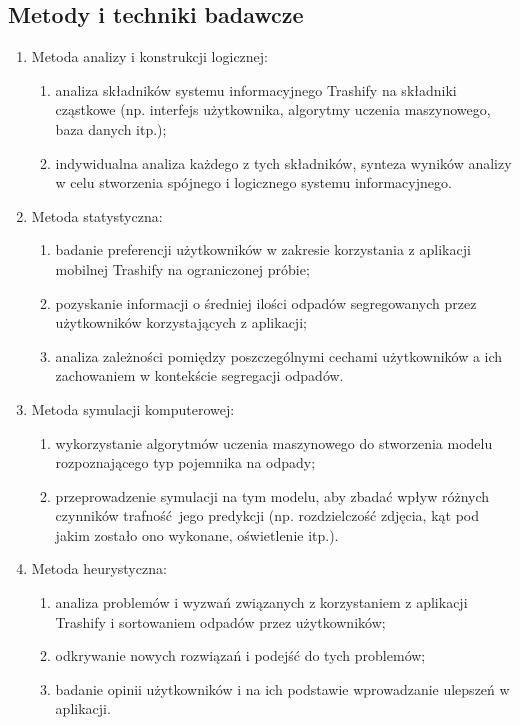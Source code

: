 \documentclass[12pt,twoside]{book}
\begin{document}
\subsection{Metody i techniki badawcze}
\begin{enumerate}
    \item Metoda analizy i konstrukcji logicznej:
    \begin{enumerate}[label=--]
        \item analiza składników systemu informacyjnego Trashify na składniki cząstkowe (np. interfejs użytkownika, algorytmy uczenia maszynowego, baza danych itp.);
        \item indywidualna analiza każdego z tych składników,
        synteza wyników analizy w celu stworzenia spójnego i logicznego systemu informacyjnego.
    \end{enumerate}
    \item Metoda statystyczna:
    \begin{enumerate}[label=--]
        \item badanie preferencji użytkowników w zakresie korzystania z aplikacji mobilnej Trashify na ograniczonej próbie;
        \item pozyskanie informacji o średniej ilości odpadów segregowanych przez użytkowników korzystających z aplikacji;
        \item analiza zależności pomiędzy poszczególnymi cechami użytkowników a ich zachowaniem w kontekście segregacji odpadów.
    \end{enumerate}
    \item Metoda symulacji komputerowej:
    \begin{enumerate}[label=--]
        \item wykorzystanie algorytmów uczenia maszynowego do stworzenia modelu rozpoznającego typ pojemnika na odpady;
        \item przeprowadzenie symulacji na tym modelu, aby zbadać wpływ różnych czynników trafność jego predykcji (np. rozdzielczość zdjęcia, kąt pod jakim zostało ono wykonane, oświetlenie itp.).
    \end{enumerate}
    \item Metoda heurystyczna:
    \begin{enumerate}[label=--]
        \item analiza problemów i wyzwań związanych z korzystaniem z aplikacji Trashify i sortowaniem odpadów przez użytkowników;
        \item odkrywanie nowych rozwiązań i podejść do tych problemów;
        \item badanie opinii użytkowników i na ich podstawie wprowadzanie ulepszeń w aplikacji.
    \end{enumerate}
\end{enumerate}
\end{document}
